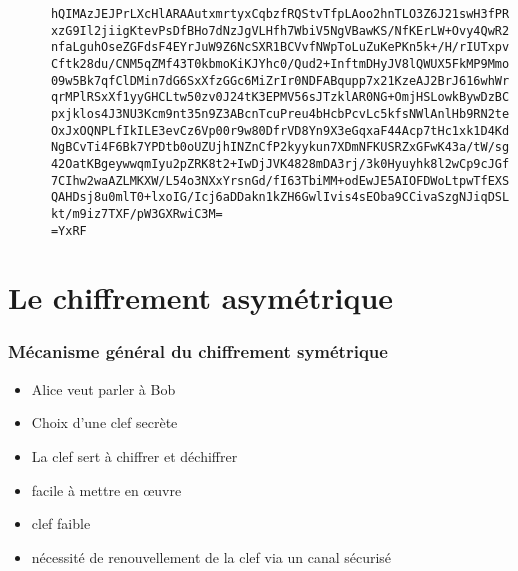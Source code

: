 \documentclass[french]{beamer}
\begin{document}
\begin{frame}[fragile]
  \begin{block}{}
    \scriptsize
    \begin{verbatim}
      hQIMAzJEJPrLXcHlARAAutxmrtyxCqbzfRQStvTfpLAoo2hnTLO3Z6J21swH3fPR
      xzG9Il2jiigKtevPsDfBHo7dNzJgVLHfh7WbiV5NgVBawKS/NfKErLW+Ovy4QwR2
      nfaLguhOseZGFdsF4EYrJuW9Z6NcSXR1BCVvfNWpToLuZuKePKn5k+/H/rIUTxpv
      Cftk28du/CNM5qZMf43T0kbmoKiKJYhc0/Qud2+InftmDHyJV8lQWUX5FkMP9Mmo
      09w5Bk7qfClDMin7dG6SxXfzGGc6MiZrIr0NDFABqupp7x21KzeAJ2BrJ616whWr
      qrMPlRSxXf1yyGHCLtw50zv0J24tK3EPMV56sJTzklAR0NG+OmjHSLowkBywDzBC
      pxjklos4J3NU3Kcm9nt35n9Z3ABcnTcuPreu4bHcbPcvLc5kfsNWlAnlHb9RN2te
      OxJxOQNPLfIkILE3evCz6Vp00r9w80DfrVD8Yn9X3eGqxaF44Acp7tHc1xk1D4Kd
      NgBCvTi4F6Bk7YPDtb0oUZUjhINZnCfP2kyykun7XDmNFKUSRZxGFwK43a/tW/sg
      42OatKBgeywwqmIyu2pZRK8t2+IwDjJVK4828mDA3rj/3k0Hyuyhk8l2wCp9cJGf
      7CIhw2waAZLMKXW/L54o3NXxYrsnGd/fI63TbiMM+odEwJE5AIOFDWoLtpwTfEXS
      QAHDsj8u0mlT0+lxoIG/Icj6aDDakn1kZH6GwlIvis4sEOba9CCivaSzgNJiqDSL
      kt/m9iz7TXF/pW3GXRwiC3M=
      =YxRF
    \end{verbatim}
    \normalsize
  \end{block}
\end{frame}

\section{Le chiffrement asymétrique}

\begin{frame}
  \frametitle{Mécanisme général du chiffrement symétrique}
  \begin{multicols}{2}
    \begin{block}{}
      \begin{itemize}
        \item Alice veut parler à Bob
        \item Choix d'une clef secrète
        \item La clef sert à chiffrer et déchiffrer
      \end{itemize}
    \end{block}
    \begin{block}{}
      \begin{itemize}
        \item facile à mettre en œuvre
        \item clef faible
        \item nécessité de renouvellement de la clef via un canal
          sécurisé
      \end{itemize}
    \end{block}
  \end{multicols}
\end{frame}
\end{document}
